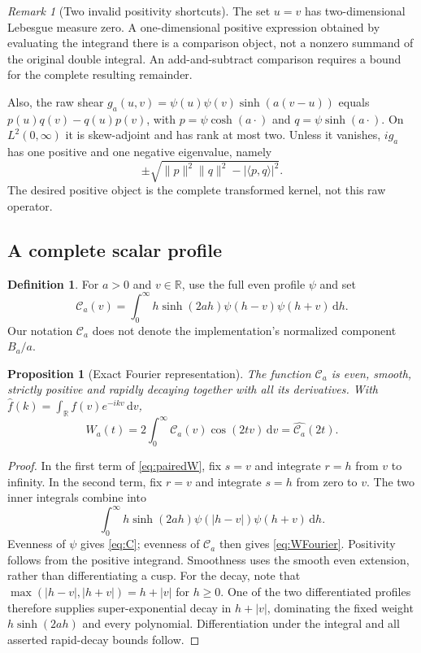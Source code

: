 \documentclass[11pt,letterpaper]{article}
\numberwithin{equation}{section}
\newtheorem{proposition}[theorem]{Proposition}
\theoremstyle{definition}
\newtheorem{definition}[theorem]{Definition}
\theoremstyle{remark}
\newtheorem{remark}[theorem]{Remark}
\newcommand{\R}{\mathbb R}
\newcommand{\dd}{\,\mathrm d}
\newcommand{\calC}{\mathcal C}
\begin{document}
\begin{remark}[Two invalid positivity shortcuts]\label{rem:invalid}
The set $u=v$ has two-dimensional Lebesgue measure zero. A one-dimensional positive expression obtained by evaluating the integrand there is a comparison object, not a nonzero summand of the original double integral. An add-and-subtract comparison requires a bound for the complete resulting remainder.

Also, the raw shear $g_a(u,v)=\psi(u)\psi(v)\sinh(a(v-u))$ equals $p(u)q(v)-q(u)p(v)$, with $p=\psi\cosh(a\cdot)$ and $q=\psi\sinh(a\cdot)$. On $L^2(0,\infty)$ it is skew-adjoint and has rank at most two. Unless it vanishes, $ig_a$ has one positive and one negative eigenvalue, namely
\[
\pm\sqrt{\|p\|^2\|q\|^2-|\langle p,q\rangle|^2}.
\]
The desired positive object is the complete transformed kernel, not this raw operator.
\end{remark}

\subsection{A complete scalar profile}
\begin{definition}\label{def:C}
For $a>0$ and $v\in\R$, use the full even profile $\psi$ and set
\begin{equation}\label{eq:C}
\calC_a(v)=\int_0^\infty h\sinh(2ah)\psi(h-v)\psi(h+v)\dd h.
\end{equation}
Our notation $\calC_a$ does not denote the implementation's normalized component $B_a/a$.
\end{definition}

\begin{proposition}[Exact Fourier representation]\label{prop:Cfourier}
The function $\calC_a$ is even, smooth, strictly positive and rapidly decaying together with all its derivatives. With $\widehat f(k)=\int_\R f(v)e^{-ikv}\dd v$,
\begin{equation}\label{eq:WFourier}
W_a(t)=2\int_0^\infty\calC_a(v)\cos(2tv)\dd v
=\widehat{\calC_a}(2t).
\end{equation}
\end{proposition}
\begin{proof}
In the first term of \eqref{eq:pairedW}, fix $s=v$ and integrate $r=h$ from $v$ to infinity. In the second term, fix $r=v$ and integrate $s=h$ from zero to $v$. The two inner integrals combine into
\[
\int_0^\infty h\sinh(2ah)\psi(|h-v|)\psi(h+v)\dd h.
\]
Evenness of $\psi$ gives \eqref{eq:C}; evenness of $\calC_a$ then gives \eqref{eq:WFourier}. Positivity follows from the positive integrand. Smoothness uses the smooth even extension, rather than differentiating a cusp. For the decay, note that $\max(|h-v|,|h+v|)=h+|v|$ for $h\ge0$. One of the two differentiated profiles therefore supplies super-exponential decay in $h+|v|$, dominating the fixed weight $h\sinh(2ah)$ and every polynomial. Differentiation under the integral and all asserted rapid-decay bounds follow.
\end{proof}
\end{document}
